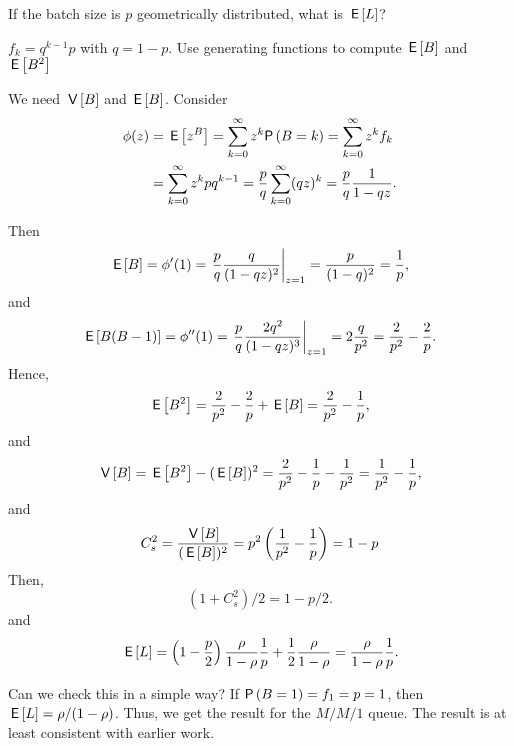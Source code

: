 \begin{exercise}
  If the batch size is $p$ geometrically distributed, what is $\,\mathsf{E}\left[L\right]$?
  \begin{hint}
$f_k=q^{k-1}p$ with $q=1-p$. Use generating functions to compute $\,\mathsf{E}\left[B\right]$ and $\,\mathsf{E}\left[B^2\right]$
  \end{hint}
\begin{solution}
  We need $\,\mathsf{V}\left[B\right]$ and $\,\mathsf{E}\left[B\right]$. Consider
  \begin{equation*}
    \begin{split}
    \phi(z) 
&= \E{z^B} = \sum_{k=0}^\infty z^k \P{B=k} = \sum_{k=0}^\infty z^k f_k \\
&= \sum_{k=0}^\infty z^k p q^{k-1} 
= \frac p q \sum_{k=0}^\infty (q z)^k = \frac p q \frac1{1-q z}.
    \end{split}
  \end{equation*}

Then
\begin{equation*}
  \,\mathsf{E}\left[B\right] = \phi'(1) = \left.\frac p q \frac q{(1-q z)^2}\right|_{z=1}= \frac p{(1-q)^2} = \frac 1 p,
\end{equation*}
and
\begin{equation*}
  \,\mathsf{E}\left[B(B-1)\right] = \phi''(1) = \left.\frac p q \frac{2q^2}{(1-q z)^3}\right|_{z=1}= 2 \frac{q}{p^2}= \frac2{p^2} - \frac 2p.
\end{equation*}
Hence, 
\begin{equation*}
  \,\mathsf{E}\left[B^2\right] = \frac2{p^2} - \frac 2p + \,\mathsf{E}\left[B\right] = \frac2{p^2} - \frac1p,
\end{equation*}
and
\begin{equation*}
  \,\mathsf{V}\left[B\right] = \,\mathsf{E}\left[B^2\right] - (\,\mathsf{E}\left[B\right])^2 = \frac2{p^2} - \frac1p - \frac1{p^2} = \frac1{p^2}-\frac1p,
\end{equation*}
and
\begin{equation*}
  C_s^2= \frac{\,\mathsf{V}\left[B\right]}{(\,\mathsf{E}\left[B\right])^2} = p^2 \left(\frac1{p^2}-\frac1p\right)=1-p
\end{equation*}
Then,
\begin{equation*}
  (1+C_s^2)/2= 1-p/2.
\end{equation*}
and 
\begin{equation*}
  \,\mathsf{E}\left[L\right] = 
\left(1-\frac p2\right) \frac\rho{1-\rho} \frac 1 p + \frac12\frac\rho{1-\rho}
=\frac\rho{1-\rho} \frac 1 p.
\end{equation*}

Can we check this in a simple way? If $\P{B=1}=f_1 = p =1$, then
$\,\mathsf{E}\left[L\right]=\rho/(1-\rho)$. Thus, we get the result for the $M/M/1$
queue. The result is at least consistent with earlier work.
\end{solution}
\end{exercise}

